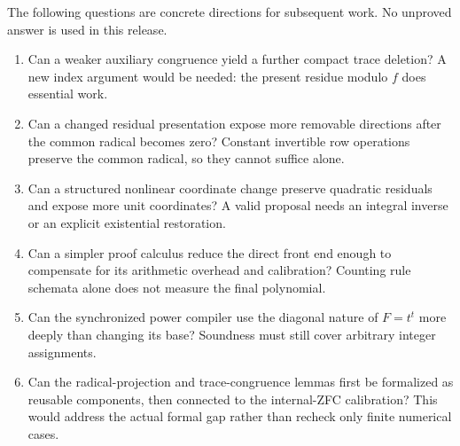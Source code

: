 The following questions are concrete directions for subsequent work.
No unproved answer is used in this release.
\begin{enumerate}
\item Can a weaker auxiliary congruence yield a further compact
trace deletion? A new index argument would be needed: the present
residue modulo $f$ does essential work.
\item Can a changed residual presentation expose more removable
directions after the common radical becomes zero? Constant invertible
row operations preserve the common radical, so they cannot suffice alone.
\item Can a structured nonlinear coordinate change preserve quadratic
residuals and expose more unit coordinates? A valid proposal needs an
integral inverse or an explicit existential restoration.
\item Can a simpler proof calculus reduce the direct front end enough
to compensate for its arithmetic overhead and calibration? Counting
rule schemata alone does not measure the final polynomial.
\item Can the synchronized power compiler use the diagonal nature
of $F=t^t$ more deeply than changing its base? Soundness must still
cover arbitrary integer assignments.
\item Can the radical-projection and trace-congruence lemmas first
be formalized as reusable components, then connected to the internal-ZFC
calibration? This would address the actual formal gap rather than
recheck only finite numerical cases.
\end{enumerate}

